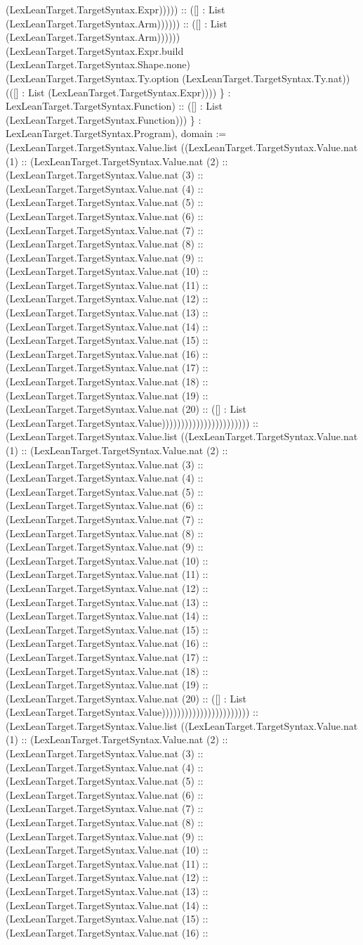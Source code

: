 \documentclass[11pt]{article}
\begin{document}
(LexLeanTarget.TargetSyntax.Expr))))) :: ([] : List (LexLeanTarget.TargetSyntax.Arm)))))) :: ([] : List (LexLeanTarget.TargetSyntax.Arm)))))) (LexLeanTarget.TargetSyntax.Expr.build (LexLeanTarget.TargetSyntax.Shape.none) (LexLeanTarget.TargetSyntax.Ty.option (LexLeanTarget.TargetSyntax.Ty.nat)) (([] : List (LexLeanTarget.TargetSyntax.Expr)))) \} : LexLeanTarget.TargetSyntax.Function) :: ([] : List (LexLeanTarget.TargetSyntax.Function))) \} : LexLeanTarget.TargetSyntax.Program), domain := (LexLeanTarget.TargetSyntax.Value.list ((LexLeanTarget.TargetSyntax.Value.nat (1) :: (LexLeanTarget.TargetSyntax.Value.nat (2) :: (LexLeanTarget.TargetSyntax.Value.nat (3) :: (LexLeanTarget.TargetSyntax.Value.nat (4) :: (LexLeanTarget.TargetSyntax.Value.nat (5) :: (LexLeanTarget.TargetSyntax.Value.nat (6) :: (LexLeanTarget.TargetSyntax.Value.nat (7) :: (LexLeanTarget.TargetSyntax.Value.nat (8) :: (LexLeanTarget.TargetSyntax.Value.nat (9) :: (LexLeanTarget.TargetSyntax.Value.nat (10) :: (LexLeanTarget.TargetSyntax.Value.nat (11) :: (LexLeanTarget.TargetSyntax.Value.nat (12) :: (LexLeanTarget.TargetSyntax.Value.nat (13) :: (LexLeanTarget.TargetSyntax.Value.nat (14) :: (LexLeanTarget.TargetSyntax.Value.nat (15) :: (LexLeanTarget.TargetSyntax.Value.nat (16) :: (LexLeanTarget.TargetSyntax.Value.nat (17) :: (LexLeanTarget.TargetSyntax.Value.nat (18) :: (LexLeanTarget.TargetSyntax.Value.nat (19) :: (LexLeanTarget.TargetSyntax.Value.nat (20) :: ([] : List (LexLeanTarget.TargetSyntax.Value))))))))))))))))))))))) :: (LexLeanTarget.TargetSyntax.Value.list ((LexLeanTarget.TargetSyntax.Value.nat (1) :: (LexLeanTarget.TargetSyntax.Value.nat (2) :: (LexLeanTarget.TargetSyntax.Value.nat (3) :: (LexLeanTarget.TargetSyntax.Value.nat (4) :: (LexLeanTarget.TargetSyntax.Value.nat (5) :: (LexLeanTarget.TargetSyntax.Value.nat (6) :: (LexLeanTarget.TargetSyntax.Value.nat (7) :: (LexLeanTarget.TargetSyntax.Value.nat (8) :: (LexLeanTarget.TargetSyntax.Value.nat (9) :: (LexLeanTarget.TargetSyntax.Value.nat (10) :: (LexLeanTarget.TargetSyntax.Value.nat (11) :: (LexLeanTarget.TargetSyntax.Value.nat (12) :: (LexLeanTarget.TargetSyntax.Value.nat (13) :: (LexLeanTarget.TargetSyntax.Value.nat (14) :: (LexLeanTarget.TargetSyntax.Value.nat (15) :: (LexLeanTarget.TargetSyntax.Value.nat (16) :: (LexLeanTarget.TargetSyntax.Value.nat (17) :: (LexLeanTarget.TargetSyntax.Value.nat (18) :: (LexLeanTarget.TargetSyntax.Value.nat (19) :: (LexLeanTarget.TargetSyntax.Value.nat (20) :: ([] : List (LexLeanTarget.TargetSyntax.Value))))))))))))))))))))))) :: (LexLeanTarget.TargetSyntax.Value.list ((LexLeanTarget.TargetSyntax.Value.nat (1) :: (LexLeanTarget.TargetSyntax.Value.nat (2) :: (LexLeanTarget.TargetSyntax.Value.nat (3) :: (LexLeanTarget.TargetSyntax.Value.nat (4) :: (LexLeanTarget.TargetSyntax.Value.nat (5) :: (LexLeanTarget.TargetSyntax.Value.nat (6) :: (LexLeanTarget.TargetSyntax.Value.nat (7) :: (LexLeanTarget.TargetSyntax.Value.nat (8) :: (LexLeanTarget.TargetSyntax.Value.nat (9) :: (LexLeanTarget.TargetSyntax.Value.nat (10) :: (LexLeanTarget.TargetSyntax.Value.nat (11) :: (LexLeanTarget.TargetSyntax.Value.nat (12) :: (LexLeanTarget.TargetSyntax.Value.nat (13) :: (LexLeanTarget.TargetSyntax.Value.nat (14) :: (LexLeanTarget.TargetSyntax.Value.nat (15) :: (LexLeanTarget.TargetSyntax.Value.nat (16) :: 
\end{document}
